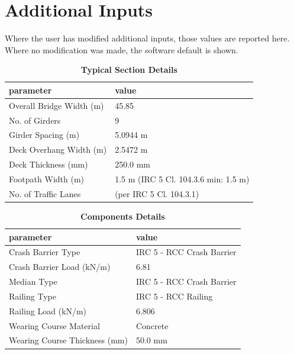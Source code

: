 \documentclass[12pt,a4paper]{report}
\numberwithin{table}{chapter}
\numberwithin{figure}{chapter}
\begin{document}
\newpage
\section{Additional Inputs}
\label{sec:additional-inputs}

Where the user has modified additional inputs, those values are reported here. Where no modification was made, the software default is shown.

\vspace{0.8cm}

\begin{longtable}{|L{5.5cm}|p{10.0cm}|}
\caption{\textbf{Typical Section Details}}
\hline
\textbf{parameter} & \textbf{value} \\
\hline
\textnormal{Overall Bridge Width (m)} & 45.85 \\[6pt]
\hline
\textnormal{No. of Girders} & 9 \\[6pt]
\hline
\textnormal{Girder Spacing (m)} & 5.0944 m \\[6pt]
\hline
\textnormal{Deck Overhang Width (m)} & 2.5472 m \\[6pt]
\hline
\textnormal{Deck Thickness (mm)} & 250.0 mm \\[6pt]
\hline
\textnormal{Footpath Width (m)} & 1.5 m (IRC 5 Cl. 104.3.6 min: 1.5 m) \\[6pt]
\hline
\textnormal{No. of Traffic Lanes} &  (per IRC 5 Cl. 104.3.1) \\[6pt]
\hline
\end{longtable}

\vspace{0.8em}

\begin{longtable}{|L{5.5cm}|p{10.0cm}|}
\caption{\textbf{Components Details}}
\hline
\textbf{parameter} & \textbf{value} \\
\hline
\textnormal{Crash Barrier Type} & IRC 5 - RCC Crash Barrier \\[6pt]
\hline
\textnormal{Crash Barrier Load (kN/m)} & 6.81 \\[6pt]
\hline
\textnormal{Median Type} & IRC 5 - RCC Crash Barrier \\[6pt]
\hline

\textnormal{Railing Type} & IRC 5 - RCC Railing \\[6pt]
\hline
\textnormal{Railing Load (kN/m)} & 6.806 \\[6pt]
\hline
\textnormal{Wearing Course Material} & Concrete \\[6pt]
\hline
\textnormal{Wearing Course Thickness (mm)} & 50.0 mm \\[6pt]
\hline
\end{longtable}
\end{document}
